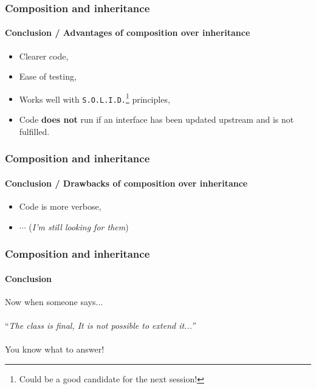 \begin{frame}
    \frametitle{Composition and inheritance}
    \framesubtitle{Conclusion / Advantages of composition over inheritance}

    \begin{itemize}[<+->]
        \item Clearer code,
        \item Ease of testing,
        \item Works well with \texttt{S.O.L.I.D.}\footnote{Could be a good candidate for the next session!} principles,
        \item Code \textbf{does not} run if an interface has been updated upstream and is not fulfilled.
    \end{itemize}
\end{frame}

\begin{frame}
    \frametitle{Composition and inheritance}
    \framesubtitle{Conclusion / Drawbacks of composition over inheritance}

    \begin{itemize}[<+->]
        \item Code is more verbose,
        \item $\cdots$ (\textit{I'm still looking for them})
    \end{itemize}
\end{frame}

\begin{frame}
    \frametitle{Composition and inheritance}
    \framesubtitle{Conclusion}

    Now when someone says...\\~\\\pause
    ``\textit{The class is final, It is not possible to extend it...''}\\~\\\pause
    You know what to answer!
\end{frame}
